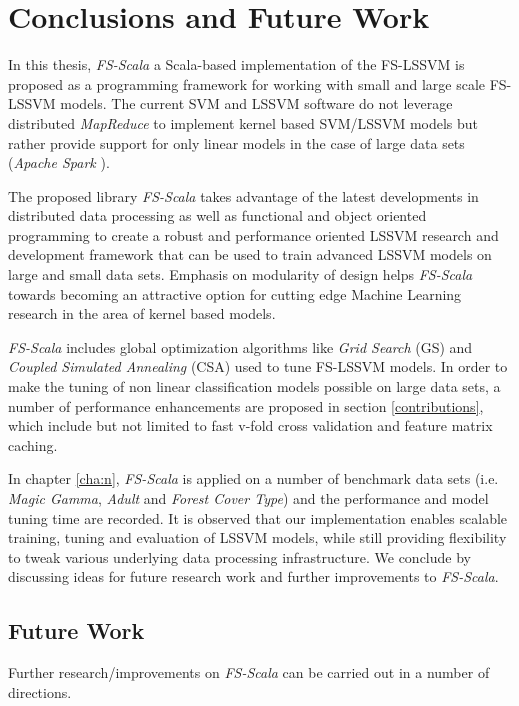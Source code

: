 \chapter{Conclusions and Future Work}\label{cha:conclusion}

In this thesis, \emph{FS-Scala} a Scala-based implementation of the FS-LSSVM is proposed as a programming framework for working with small and large scale FS-LSSVM models. The current SVM and LSSVM software do not leverage distributed \emph{MapReduce} to implement kernel based SVM/LSSVM models but rather provide support for only linear models in the case of large data sets (\emph{Apache Spark} \cite{Spark:2010}). 

The proposed library  \emph{FS-Scala} takes advantage of the latest developments in distributed data processing as well as functional and object oriented programming to create a robust and performance oriented LSSVM research and development framework that can be used to train advanced LSSVM models on large and small data sets. Emphasis on modularity of design helps \emph{FS-Scala} towards becoming an attractive option for cutting edge Machine Learning research in the area of kernel based models.

\emph{FS-Scala} includes global optimization algorithms like \emph{Grid Search} (GS) and \emph{Coupled Simulated Annealing} (CSA) used to tune FS-LSSVM models. In order to make the tuning of non linear classification models possible on large data sets, a number of performance enhancements are proposed in section \ref{contributions}, which include but not limited to fast v-fold cross validation and feature matrix caching.

In chapter \ref{cha:n}, \emph{FS-Scala} is applied on a number of benchmark data sets (i.e. \emph{Magic Gamma}, \emph{Adult} and \emph{Forest Cover Type}) and the performance and model tuning time are recorded. It is observed that our implementation enables scalable training, tuning and evaluation of LSSVM models, while still providing flexibility to tweak various underlying data processing infrastructure. We conclude by discussing ideas for future research work and further improvements to \emph{FS-Scala}. 

\section*{Future Work}

Further research/improvements on \emph{FS-Scala} can be carried out in a number of directions.

